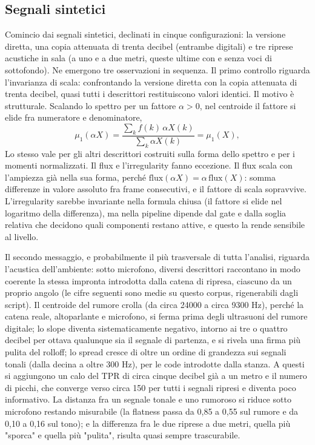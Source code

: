 \documentclass{article}
\begin{document}
\subsection{Segnali sintetici}\label{sec:sintetici}
Comincio dai segnali sintetici, declinati in cinque configurazioni: la versione diretta, una copia attenuata di trenta decibel (entrambe digitali) e tre riprese acustiche in sala (a uno e a due metri, queste ultime con e senza voci di sottofondo). Ne emergono tre osservazioni in sequenza. Il primo controllo riguarda l'invarianza di scala: confrontando la versione diretta con la copia attenuata di trenta decibel, quasi tutti i descrittori restituiscono valori identici. Il motivo è strutturale. Scalando lo spettro per un fattore $\alpha>0$, nel centroide il fattore si elide fra numeratore e denominatore,
\begin{equation*}
  \mu_1(\alpha X)=\frac{\sum_k f(k)\,\alpha X(k)}{\sum_k \alpha X(k)}=\mu_1(X),
\end{equation*}
 Lo stesso vale per gli altri descrittori costruiti sulla forma dello spettro e per i momenti normalizzati. Il flux e l'irregularity fanno eccezione. Il flux scala con l'ampiezza già nella sua forma, perché $\text{flux}(\alpha X)=\alpha\,\text{flux}(X)$: somma differenze in valore assoluto fra frame consecutivi, e il fattore di scala sopravvive. L'irregularity sarebbe invariante nella formula chiusa (il fattore si elide nel logaritmo della differenza), ma nella pipeline dipende dal gate e dalla soglia relativa che decidono quali componenti restano attive, e questo la rende sensibile al livello. %

Il secondo messaggio, e probabilmente il più trasversale di tutta l'analisi, riguarda l'acustica dell'ambiente: sotto microfono, diversi descrittori raccontano in modo coerente la stessa impronta introdotta dalla catena di ripresa, ciascuno da un proprio angolo (le cifre seguenti sono medie su questo corpus, rigenerabili dagli script). Il centroide del rumore crolla (da circa 24000 a circa 9300 Hz), perché la catena reale, altoparlante e microfono, si ferma prima degli ultrasuoni del rumore digitale; lo slope diventa sistematicamente negativo, intorno ai tre o quattro decibel per ottava qualunque sia il segnale di partenza, e si rivela una firma più pulita del rolloff; lo spread cresce di oltre un ordine di grandezza sui segnali tonali (dalla decina a oltre 300 Hz), per le code introdotte dalla stanza. A questi si aggiungono un calo del TPR di circa cinque decibel già a un metro e il numero di picchi, che converge verso circa 150 per tutti i segnali ripresi e diventa poco informativo. La distanza fra un segnale tonale e uno rumoroso si riduce sotto microfono restando misurabile (la flatness passa da 0,85 a 0,55 sul rumore e da 0,10 a 0,16 sul tono); e la differenza fra le due riprese a due metri, quella più "sporca" e quella più "pulita", risulta quasi sempre trascurabile.
\end{document}
